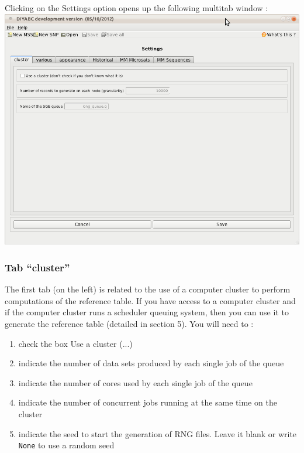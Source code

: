 \newpage

Clicking on the \textsf{Settings} option opens up the following multitab window :\\

\includegraphics[scale=0.33]{gui_pictures/Capture-DIYABC-92.png} \\

\subsubsection{Tab \textsf{``cluster''}}\label{clustergui}
The first tab (on the left) is related to the use of a computer cluster to perform computations of the reference table. If you have access to a computer cluster and if the computer cluster runs a scheduler queuing system, then you can use it to generate the reference table (detailed in section 5). You will need to :
\begin{enumerate}
 \item check the box \textsf{Use a cluster (...)}
 \item indicate the number of data sets produced by each single job of the queue
 \item indicate the number of cores used by each single job of the queue
 \item indicate the number of concurrent jobs running at the same time on the cluster
 \item indicate the seed to start the generation of RNG files. Leave it blank or write \texttt{None} to use a random seed
\end{enumerate}

